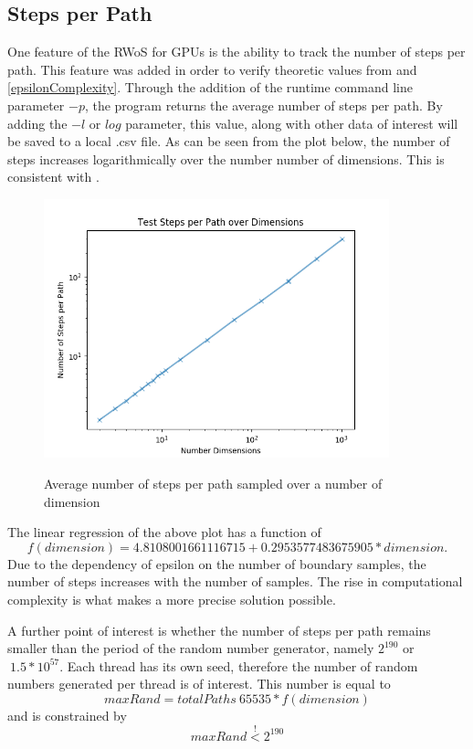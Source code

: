 \subsection{Steps per Path}
One feature of the \Gls{RWoS} for \Glspl{GPU} is the ability to track the number of
steps per path.  This feature was added in order to verify theoretic values from \cite{Bornemann,DeLaurentis} and
\ref{epsilonComplexity}.  Through the addition of the runtime command line parameter
$-p$, the program returns the average number of steps per path.  By adding the $-l$
or  \textendash$log$
parameter, this value, along with other data of interest will be saved to a local
.csv file.  As can be seen from the plot below, the number of steps increases
logarithmically over the number number of dimensions.  This is consistent with \cite{Bornemann, DeLaurentis}.
\begin{figure}
\begin{center}
\includegraphics[width=10.0cm]{styles/pathsPerDim} \label{plot:pathsPerDim}
  \caption{Average number of steps per path sampled over a number of dimension}
\end{center}
\end{figure}
The linear regression of the above plot has a function of $$f(dimension)= 4.8108001661116715 + 0.2953577483675905*dimension.$$
Due to the dependency of epsilon on the number of boundary samples, the number of steps
increases with the number of samples.  The rise in computational complexity is what
makes a more precise solution possible.
\par
A further point of interest is whether the number of steps per path remains smaller
than the period of the random number generator, namely $2^{190}$ or $~1.5 * 10^{57}$.
Each thread has its own seed, therefore the number of random numbers generated per
thread is of interest.  This number is equal to
$$maxRand = total Paths \ 65535 * f(dimension)$$ and is constrained by
$$ maxRand \overset{!}{<} 2^{190}$$

